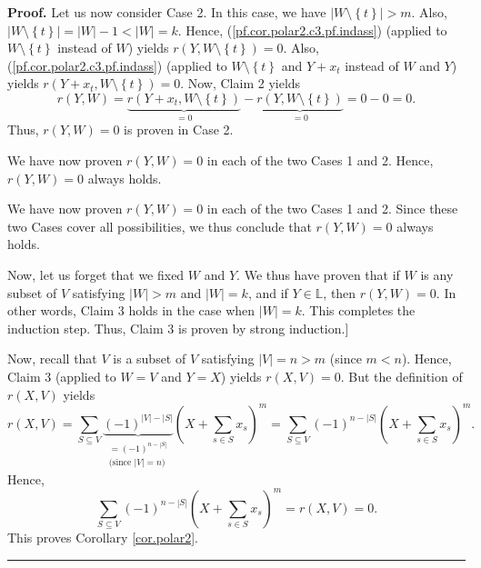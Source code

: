 \documentclass[numbers=enddot,12pt,final,onecolumn,notitlepage]{scrartcl}%
\theoremstyle{definition}
\newenvironment{proof}[1][Proof]{\noindent\textbf{#1.} }{\ \rule{0.5em}{0.5em}}
\let\sumnonlimits\sum
\renewcommand{\sum}{\sumnonlimits\limits}
\newenvironment{verlong}{}{}
\newenvironment{vershort}{}{}
\begin{document}
\begin{proof}
Let us now consider Case 2. In this case, we have $\left\vert W\setminus
\left\{  t\right\}  \right\vert >m$. Also, $\left\vert W\setminus\left\{
t\right\}  \right\vert =\left\vert W\right\vert -1<\left\vert W\right\vert
=k$. Hence, (\ref{pf.cor.polar2.c3.pf.indass}) (applied to $W\setminus\left\{
t\right\}  $ instead of $W$) yields $r\left(  Y,W\setminus\left\{  t\right\}
\right)  =0$. Also, (\ref{pf.cor.polar2.c3.pf.indass}) (applied to
$W\setminus\left\{  t\right\}  $ and $Y+x_{t}$ instead of $W$ and $Y$) yields
$r\left(  Y+x_{t},W\setminus\left\{  t\right\}  \right)  =0$. Now, Claim 2
yields%
\[
r\left(  Y,W\right)  =\underbrace{r\left(  Y+x_{t},W\setminus\left\{
t\right\}  \right)  }_{=0}-\underbrace{r\left(  Y,W\setminus\left\{
t\right\}  \right)  }_{=0}=0-0=0.
\]
Thus, $r\left(  Y,W\right)  =0$ is proven in Case 2.

\begin{vershort}
We have now proven $r\left(  Y,W\right)  =0$ in each of the two Cases 1 and 2.
Hence, $r\left(  Y,W\right)  =0$ always holds.
\end{vershort}

\begin{verlong}
We have now proven $r\left(  Y,W\right)  =0$ in each of the two Cases 1 and 2.
Since these two Cases cover all possibilities, we thus conclude that $r\left(
Y,W\right)  =0$ always holds.
\end{verlong}

Now, let us forget that we fixed $W$ and $Y$. We thus have proven that if $W$
is any subset of $V$ satisfying $\left\vert W\right\vert >m$ and $\left\vert
W\right\vert =k$, and if $Y\in\mathbb{L}$, then $r\left(  Y,W\right)  =0$. In
other words, Claim 3 holds in the case when $\left\vert W\right\vert =k$. This
completes the induction step. Thus, Claim 3 is proven by strong induction.]

Now, recall that $V$ is a subset of $V$ satisfying $\left\vert V\right\vert
=n>m$ (since $m<n$). Hence, Claim 3 (applied to $W=V$ and $Y=X$) yields
$r\left(  X,V\right)  =0$. But the definition of $r\left(  X,V\right)  $
yields%
\[
r\left(  X,V\right)  =\sum_{S\subseteq V}\underbrace{\left(  -1\right)
^{\left\vert V\right\vert -\left\vert S\right\vert }}_{\substack{=\left(
-1\right)  ^{n-\left\vert S\right\vert }\\\text{(since }\left\vert
V\right\vert =n\text{)}}}\left(  X+\sum_{s\in S}x_{s}\right)  ^{m}%
=\sum_{S\subseteq V}\left(  -1\right)  ^{n-\left\vert S\right\vert }\left(
X+\sum_{s\in S}x_{s}\right)  ^{m}.
\]
Hence,%
\[
\sum_{S\subseteq V}\left(  -1\right)  ^{n-\left\vert S\right\vert }\left(
X+\sum_{s\in S}x_{s}\right)  ^{m}=r\left(  X,V\right)  =0.
\]
This proves Corollary \ref{cor.polar2}.
\end{proof}
\end{document}
